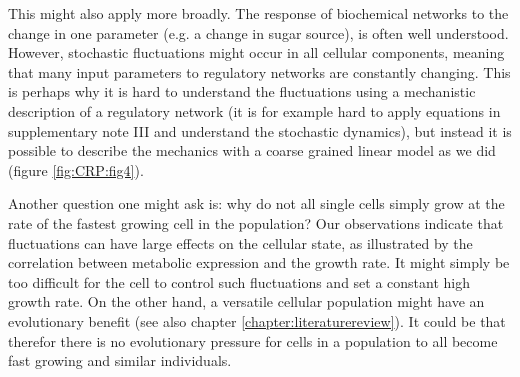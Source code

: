 % 
This might also apply more broadly. 
%
The response of biochemical networks to the change in one parameter (e.g. a change in sugar source), is often well understood.
%
However, stochastic fluctuations might occur in all cellular components, meaning that many input parameters to regulatory networks are constantly changing.
%
This is perhaps why it is hard to understand the fluctuations 
using a mechanistic description of a regulatory network
(it is for example hard to apply equations in supplementary note III and understand the stochastic dynamics), 
but instead it is possible to describe the mechanics with a coarse grained linear model as we did (figure \ref{fig:CRP:fig4}).




Another question one might ask is: why do not all single cells simply grow at the rate of the fastest growing cell in the population?
%
%
Our observations indicate that fluctuations can have large effects on the cellular state, 
as illustrated by the correlation between metabolic expression and the growth rate.
%
It might simply be too difficult for the cell to control such fluctuations
and set a constant high growth rate.
%
%
On the other hand, a versatile cellular population might have an evolutionary benefit (see also chapter \ref{chapter:literaturereview}).
%
It could be that therefor there is no evolutionary pressure for cells in a population to all become fast growing and similar individuals.

